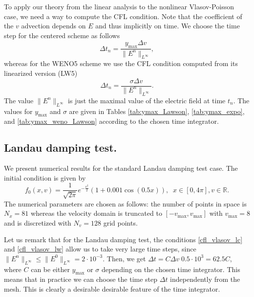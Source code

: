To apply our theory from the linear analysis to the nonlinear Vlasov-Poisson case, we need a way to compute the CFL condition. Note that the coefficient of the $v$ advection depends on $E$ and thus implicitly on time. We choose the time step for the centered scheme as follows
\begin{equation}
\label{cfl_vlasov_lc}
\Delta t_n = \frac{y_{\max} \Delta v}{\| E^n \|_{L^\infty}}, 
\end{equation}
whereas for the WENO5 scheme we use the CFL condition computed from its linearized version (LW5)
\begin{equation}
\label{cfl_vlasov_lw}
\Delta t_n = \frac{\sigma \Delta v}{\| E^n \|_{L^\infty}}.
\end{equation}
The value $\| E^n \|_{L^\infty}$ is just the maximal value of the electric field at time $t_n$. The values for  $y_{\max}$ and $\sigma$ are given in Tables \ref{tab:ymax_Lawson}, \ref{tab:ymax_expo}, and \ref{tab:ymax_weno_Lawson} according to the chosen time integrator. 


\subsection{Landau damping test.} 

We present numerical results for the standard Landau damping test case. The initial condition is given by
$$
f_0(x, v) = \frac{1}{\sqrt{2\pi}} e^{-\frac{v^2}{2}} (1+0.001 \cos(0.5 x)), \;\; x\in [0, 4\pi], v\in \mathbb{R}. 
$$
The numerical parameters are chosen as follows: the number of points in space is $N_x=81$ whereas the velocity domain 
is truncated to $[-v_{\max}, v_{\max}]$ with $v_{\max}=8$ and is discretized with $N_v=128$ grid points.

Let us remark that for the Landau damping test, the conditions \eqref{cfl_vlasov_lc} and 
\eqref{cfl_vlasov_lw} allow us to take very large time steps, since $\| E^n \|_{L^\infty} \leq \| E^0 \|_{L^\infty} = 2\cdot 10^{-3}$. Then, 
we get $\Delta t = C \Delta v \; 0.5\cdot 10^3 =  62.5 C$, where $C$ can be either $y_{\max}$ or $\sigma$ depending on the chosen time integrator. This means that in practice we can choose the time step $\Delta t$ independently from the mesh. This is clearly a desirable desirable feature of the time integrator.

